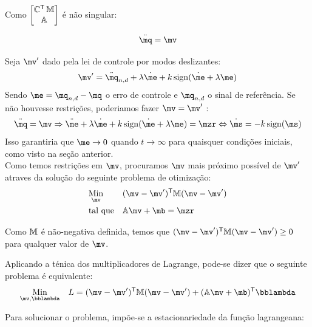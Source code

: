\documentclass[a4paper,11pt,brazil,fleqn]{article}
\begin{document}
Como $\begin{bmatrix} \mathbb{C}^{\mathsf{T}} \, \mathbb{M} \\ \mathbb{A} \end{bmatrix}$ \'e n\~ao singular:

\begin{equation} \label{eq:ClosedLoopV}
\ddot{\mq} = \mv
\end{equation}

Seja $\mv'$ dado pela lei de controle por modos deslizantes:
\begin{equation} \label{eq:SMControlowLasV1'}
\mv' = \ddot{\mq}_{n, d} + \lambda \dot{\me} + k \sign (\dot{\me} + \lambda \me)
\end{equation}
Sendo $ \me = \mq_{n,d} - \mq $ o erro de controle e $\mq_{n,d}$ o sinal de refer\^encia. Se n\~ao houvesse restri\c{c}\~oes, poderiamos fazer $ \mv = \mv' $ :
$$ \ddot{\mq} = \mv \Rightarrow  \ddot{\me} + \lambda \dot{\me} + k \sign (\dot{\me} + \lambda \me) = \mzr \Leftrightarrow \dot{\ms} = - k \sign(\ms)$$
Isso garantiria que $\me \rightarrow 0$ quando $t \rightarrow \infty$ para quaisquer condi\c{c}\~oes iniciais, como visto na se\c{c}\~ao anterior. \\

Como temos restri\c{c}\~oes em $\mv$, procuramos $\mv$ mais pr\'oximo poss\'ivel de $\mv'$ atraves da solu\c{c}\~ao do seguinte problema de otimiza\c{c}\~ao:
\begin{equation} \label{eq:Optimization}
\begin{aligned}
& \underset{\mv}{\text{Min}}
& & (\mv - \mv')^\msT \mM (\mv - \mv') \\
& \text{tal que}
& & \mA \mv + \mb = \mzr
\end{aligned}
\end{equation}

Como $\mathbb{M}$ \'e n\~ao-negativa definida, temos que $(\mv - \mv')^\msT \mM (\mv - \mv') \geq 0 $ para qualquer valor de $\mv$.

Aplicando a t\'enica dos multiplicadores de Lagrange, pode-se dizer que o seguinte problema \'e equivalente:
\begin{equation}
\begin{aligned}
& \underset{\mv, \mlambda}{\text{Min}}
& & L = (\mv - \mv')^\msT \mM (\mv - \mv') + (\mA \mv + \mb)^\msT \mlambda \\
\end{aligned}
\end{equation}


Para solucionar o problema, imp\~oe-se a estacionariedade da fun\c{c}\~ao lagrangeana:
\end{document}
